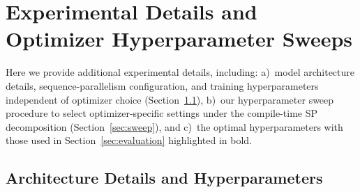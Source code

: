 \documentclass{article}
\begin{document}
\section{Experimental Details and Optimizer Hyperparameter Sweeps}
\label{sec:appendix_a}

Here we provide additional experimental details, including: a)~model architecture details, sequence-parallelism configuration, and training hyperparameters independent of optimizer choice (Section~\ref{sec:arch_details}), b)~our hyperparameter sweep procedure to select optimizer-specific settings under the compile-time SP decomposition (Section~\ref{sec:sweep}), and c)~the optimal hyperparameters with those used in Section~\ref{sec:evaluation} highlighted in bold.

\subsection{Architecture Details and Hyperparameters}
\label{sec:arch_details}

\begin{table}[ht]
\centering
\caption{Model architecture, sequence-parallelism configuration, and training parameters.
Here, \#Blocks, \#Heads, $d_{\text{model}}$, $|V|$, and Exp.\ Ratio denote the number of transformer blocks, attention heads, embedding dimension, vocabulary size, and feedforward expansion ratio, respectively.
All models use RoPE~\citep{su2023roformerenhancedtransformerrotary}, SiLU activation, norm-based gradient clipping with bound $\rho$, and initialization scale $\sigma = 1/\sqrt{d_{\text{model}}}$.
$|B_G|$ is the global batch size, $T$ is the number of optimization steps, and $P_{\text{SP}}$ is the compile-time sequence-parallel degree.
All experiments use Ulysses head splitting, with $P_{\text{SP}}$ constrained to evenly divide \#Heads.}
\label{tab:arch}
\end{table}
\end{document}
